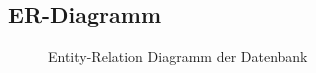 \documentclass[10pt,a4paper]{scrartcl}
\begin{document}
\subsection{ER-Diagramm}
\begin{figure}[!htbp]
 \caption{Entity-Relation Diagramm der Datenbank}
\end{figure}
\newpage
\end{document}
